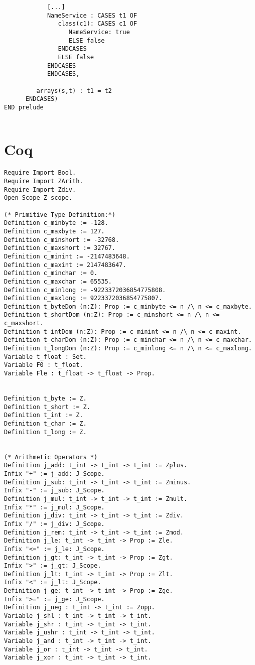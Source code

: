 \begin{verbatim}
            [...]
            NameService : CASES t1 OF
               class(c1): CASES c1 OF
                  NameService: true
                  ELSE false
               ENDCASES
               ELSE false
            ENDCASES
            ENDCASES,

         arrays(s,t) : t1 = t2
      ENDCASES)
END prelude


 \end{verbatim}
\section{Coq}
 \begin{verbatim}
Require Import Bool.
Require Import ZArith.
Require Import Zdiv.
Open Scope Z_scope.

(* Primitive Type Definition:*)
Definition c_minbyte := -128.
Definition c_maxbyte := 127.
Definition c_minshort := -32768.
Definition c_maxshort := 32767.
Definition c_minint := -2147483648.
Definition c_maxint := 2147483647.
Definition c_minchar := 0.
Definition c_maxchar := 65535.
Definition c_minlong := -9223372036854775808.
Definition c_maxlong := 9223372036854775807.
Definition t_byteDom (n:Z): Prop := c_minbyte <= n /\ n <= c_maxbyte.
Definition t_shortDom (n:Z): Prop := c_minshort <= n /\ n <= c_maxshort.
Definition t_intDom (n:Z): Prop := c_minint <= n /\ n <= c_maxint.
Definition t_charDom (n:Z): Prop := c_minchar <= n /\ n <= c_maxchar.
Definition t_longDom (n:Z): Prop := c_minlong <= n /\ n <= c_maxlong.
Variable t_float : Set.
Variable F0 : t_float.
Variable Fle : t_float -> t_float -> Prop.


Definition t_byte := Z.
Definition t_short := Z.
Definition t_int := Z.
Definition t_char := Z.
Definition t_long := Z.


(* Arithmetic Operators *)
Definition j_add: t_int -> t_int -> t_int := Zplus.
Infix "+" := j_add: J_Scope.
Definition j_sub: t_int -> t_int -> t_int := Zminus.
Infix "-" := j_sub: J_Scope.
Definition j_mul: t_int -> t_int -> t_int := Zmult.
Infix "*" := j_mul: J_Scope.
Definition j_div: t_int -> t_int -> t_int := Zdiv.
Infix "/" := j_div: J_Scope.
Definition j_rem: t_int -> t_int -> t_int := Zmod.
Definition j_le: t_int -> t_int -> Prop := Zle.
Infix "<=" := j_le: J_Scope.
Definition j_gt: t_int -> t_int -> Prop := Zgt.
Infix ">" := j_gt: J_Scope.
Definition j_lt: t_int -> t_int -> Prop := Zlt.
Infix "<" := j_lt: J_Scope.
Definition j_ge: t_int -> t_int -> Prop := Zge.
Infix ">=" := j_ge: J_Scope.
Definition j_neg : t_int -> t_int := Zopp.
Variable j_shl : t_int -> t_int -> t_int.
Variable j_shr : t_int -> t_int -> t_int.
Variable j_ushr : t_int -> t_int -> t_int.
Variable j_and : t_int -> t_int -> t_int.
Variable j_or : t_int -> t_int -> t_int.
Variable j_xor : t_int -> t_int -> t_int.


\end{verbatim}

